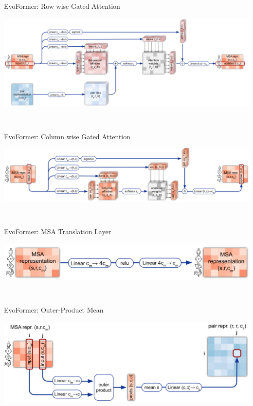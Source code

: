 \documentclass[presentation, smaller]{beamer}
\begin{document}
\begin{frame}[label={sec:orgcb1235a}]{EvoFormer: Row wise Gated Attention}
\begin{center}
\includegraphics[width=.9\linewidth]{./imgs/rowwise-gated-attention.png}
\end{center}~\cite{jumperHighlyAccurateProtein2021}
\end{frame}
\begin{frame}[label={sec:orgc40bd97}]{EvoFormer: Column wise Gated Attention}
\begin{center}
\includegraphics[width=.9\linewidth]{./imgs/columnwise-gated-attention.png}
\end{center}~\cite{jumperHighlyAccurateProtein2021}
\end{frame}
\begin{frame}[label={sec:orgff0da82}]{EvoFormer: MSA Translation Layer}
\begin{center}
\includegraphics[width=.9\linewidth]{./imgs/msa-translation-layer.png}
\end{center}~\cite{jumperHighlyAccurateProtein2021}
\end{frame}
\begin{frame}[label={sec:org20a1149}]{EvoFormer: Outer-Product Mean}
\begin{center}
\includegraphics[width=.9\linewidth]{./imgs/outer-product-mean.png}
\end{center}~\cite{jumperHighlyAccurateProtein2021}
\end{frame}
\end{document}
